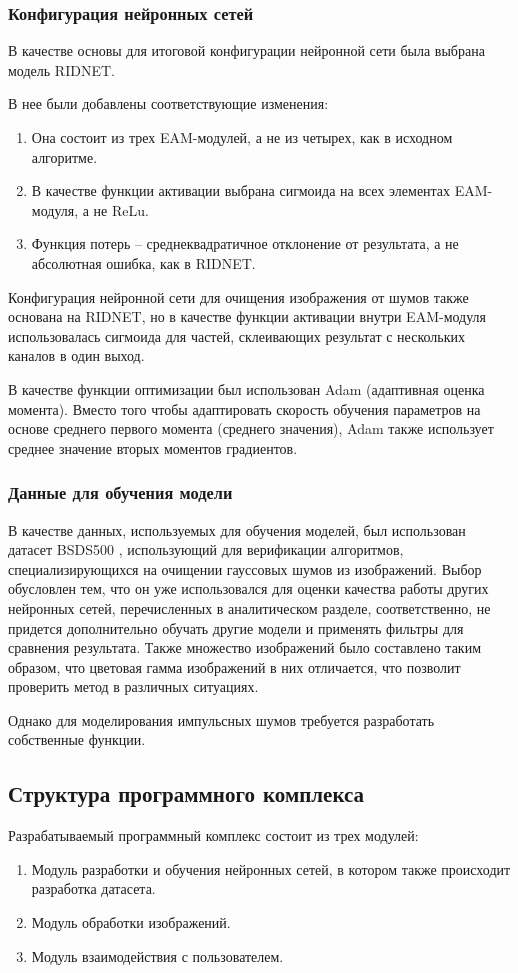 \subsubsection{Конфигурация нейронных сетей}
В качестве основы для итоговой конфигурации нейронной сети была выбрана модель RIDNET.

В нее были добавлены соответствующие изменения:
\begin{enumerate}
	\item Она состоит из трех EAM-модулей, а не из четырех, как в исходном алгоритме.
	\item В качестве функции активации выбрана сигмоида на всех элементах EAM-модуля, а не ReLu.
	\item Функция потерь -- среднеквадратичное отклонение от результата, а не абсолютная ошибка, как в RIDNET.
\end{enumerate}

Конфигурация нейронной сети для очищения изображения от шумов также основана на RIDNET, но в качестве функции активации внутри EAM-модуля использовалась сигмоида для частей, склеивающих результат с нескольких каналов в один выход.

В качестве функции оптимизации был использован Adam (адаптивная оценка момента).
Вместо того чтобы адаптировать скорость обучения параметров на основе среднего первого момента (среднего значения), Adam также использует среднее значение вторых моментов градиентов.

\subsubsection{Данные для обучения модели}
В качестве данных, используемых для обучения моделей, был использован датасет BSDS500 \cite{ridnet2}, использующий для верификации алгоритмов, специализирующихся на очищении гауссовых шумов из изображений.
Выбор обусловлен тем, что он уже использовался для оценки качества работы других нейронных сетей, перечисленных в аналитическом разделе, соответственно, не придется дополнительно обучать другие модели и применять фильтры для сравнения результата.
Также множество изображений было составлено таким образом, что цветовая гамма изображений в них отличается, что позволит проверить метод в различных ситуациях.

Однако для моделирования импульсных шумов требуется разработать собственные функции.

\subsection{Структура программного комплекса}
Разрабатываемый программный комплекс состоит из трех модулей:
\begin{enumerate}
	\item Модуль разработки и обучения нейронных сетей, в котором также происходит разработка датасета.
	\item Модуль обработки изображений.
	\item Модуль взаимодействия с пользователем.
\end{enumerate}

